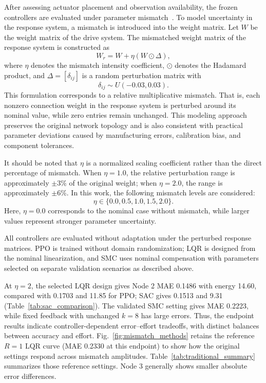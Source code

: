 \documentclass[a4paper,fleqn]{cas-sc}
\theoremstyle{plain}
\theoremstyle{definition}
\begin{document}
After assessing actuator placement and observation availability, the frozen controllers are evaluated under parameter mismatch~\cite{zhang2011weak}. To model uncertainty in the response system, a mismatch is introduced into the weight matrix. Let $W$ be the weight matrix of the drive system. The mismatched weight matrix of the response system is constructed as
\begin{equation}
	W_r = W + \eta (W\odot \Delta),
	\label{eq:mismatch_matrix}
\end{equation}
where $\eta$ denotes the mismatch intensity coefficient, $\odot$ denotes the Hadamard product, and $\Delta=[\delta_{ij}]$ is a random perturbation matrix with
\begin{equation}
	\delta_{ij}\sim U(-0.03,0.03).
	\label{eq:mismatch_delta}
\end{equation}
This formulation corresponds to a relative multiplicative mismatch. That is, each nonzero connection weight in the response system is perturbed around its nominal value, while zero entries remain unchanged. This modeling approach preserves the original network topology and is also consistent with practical parameter deviations caused by manufacturing errors, calibration bias, and component tolerances.

It should be noted that $\eta$ is a normalized scaling coefficient rather than the direct percentage of mismatch. When $\eta=1.0$, the relative perturbation range is approximately $\pm 3\%$ of the original weight; when $\eta=2.0$, the range is approximately $\pm 6\%$. In this work, the following mismatch levels are considered:
\begin{equation}
	\eta\in\{0.0,0.5,1.0,1.5,2.0\}.
	\label{eq:mismatch_levels}
\end{equation}
Here, $\eta=0.0$ corresponds to the nominal case without mismatch, while larger values represent stronger parameter uncertainty.

All controllers are evaluated without adaptation under the perturbed response matrices. PPO is trained without domain randomization; LQR is designed from the nominal linearization, and SMC uses nominal compensation with parameters selected on separate validation scenarios as described above.

At $\eta=2$, the selected LQR design gives Node 2 MAE 0.1486 with energy 14.60, compared with 0.1703 and 11.85 for PPO; SAC gives 0.1513 and 9.31 (Table~\ref{tab:sac_comparison}). The validated SMC setting gives MAE 0.2223, while fixed feedback with unchanged $k=8$ has large errors. Thus, the endpoint results indicate controller-dependent error--effort tradeoffs, with distinct balances between accuracy and effort. Fig.~\ref{fig:mismatch_methods} retains the reference $R=1$ LQR curve (MAE 0.2330 at this endpoint) to show how the original settings respond across mismatch amplitudes. Table~\ref{tab:traditional_summary} summarizes those reference settings. Node 3 generally shows smaller absolute error differences.
\end{document}
